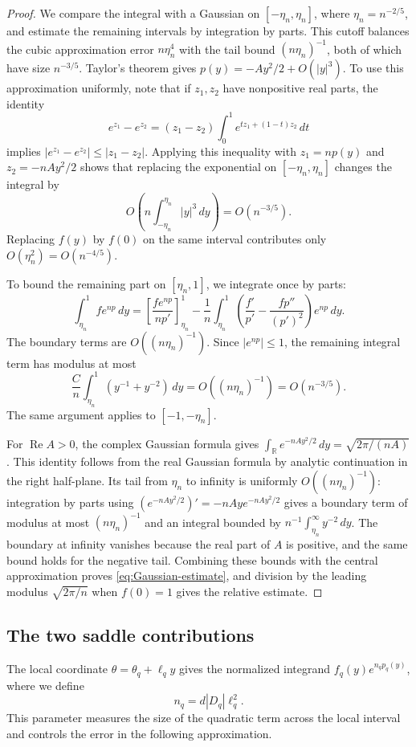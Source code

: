 \documentclass[11pt,reqno]{amsart}
\numberwithin{equation}{section}
\renewcommand{\Re}{\operatorname{Re}}
\newcommand{\R}{\mathbb R}
\newcommand{\dd}{\,d}
\begin{document}
\begin{proof}
We compare the integral with a Gaussian on
$[-\eta_n,\eta_n]$, where $\eta_n=n^{-2/5}$, and estimate the
remaining intervals by integration by parts. This cutoff balances
the cubic approximation error $n\eta_n^4$ with the tail bound
$(n\eta_n)^{-1}$, both of which have size $n^{-3/5}$.
Taylor's theorem gives $p(y)=-Ay^2/2+O(|y|^3)$.
To use this approximation uniformly, note that if $z_1,z_2$ have nonpositive real
parts, the identity
\[
 e^{z_1}-e^{z_2}=(z_1-z_2)
                \int_0^1e^{tz_1+(1-t)z_2}\dd t
\]
implies $|e^{z_1}-e^{z_2}|\le|z_1-z_2|$.
Applying this inequality with $z_1=np(y)$ and $z_2=-nAy^2/2$
shows that replacing the exponential on $[-\eta_n,\eta_n]$ changes the
integral by
\[
 O\!\left(n\int_{-\eta_n}^{\eta_n}|y|^3\dd y\right)=O(n^{-3/5}).
\]
Replacing $f(y)$ by $f(0)$ on the same interval contributes only
$O(\eta_n^2)=O(n^{-4/5})$.

To bound the remaining part on $[\eta_n,1]$, we integrate once by parts:
\[
 \int_{\eta_n}^1f e^{np}\dd y
 =\left[\frac{f e^{np}}{np'}\right]_{\eta_n}^1
 -\frac1n\int_{\eta_n}^1
       \left(\frac{f'}{p'}-\frac{fp''}{(p')^2}\right)e^{np}\dd y.
\]
The boundary terms are $O((n\eta_n)^{-1})$. Since $|e^{np}|\le1$,
the remaining integral term has modulus at most
\[
 \frac Cn\int_{\eta_n}^1(y^{-1}+y^{-2})\dd y
 =O((n\eta_n)^{-1})=O(n^{-3/5}).
\]
The same argument applies to $[-1,-\eta_n]$.

For $\Re A>0$, the complex Gaussian formula gives
$\int_\R e^{-nAy^2/2}\dd y=\sqrt{2\pi/(nA)}$.
This identity follows from the real Gaussian formula by analytic
continuation in the right half-plane. Its tail from $\eta_n$ to infinity
is uniformly $O((n\eta_n)^{-1})$: integration by parts using
$(e^{-nAy^2/2})'=-nAy e^{-nAy^2/2}$ gives a boundary term of
modulus at most $(n\eta_n)^{-1}$ and an integral bounded by
$n^{-1}\int_{\eta_n}^\infty y^{-2}\dd y$. The boundary at infinity
vanishes because the real part of $A$ is positive, and the same
bound holds for the negative tail.
Combining these bounds with the central approximation proves
\eqref{eq:Gaussian-estimate}, and division by the leading modulus
$\sqrt{2\pi/n}$ when $f(0)=1$ gives the relative estimate.
\end{proof}

\subsection{The two saddle contributions}

The local coordinate $\theta=\theta_q+\ell_qy$ gives the normalized
integrand $f_q(y)e^{n_qp_q(y)}$, where we define
\begin{equation}\label{eq:nq-definition}
 n_q=d|D_q|\ell_q^2.
\end{equation}
This parameter measures the size of the quadratic term across the
local interval and controls the error in the following approximation.
\end{document}
